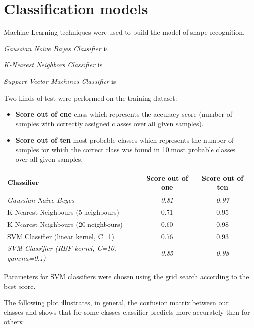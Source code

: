 \documentclass[12pt]{article}
\begin{document}
 
\section{Classification models}

Machine Learning techniques were used to build the model of shape recognition.  

\textit{Gaussian Naive Bayes Classifier} is

\textit{K-Nearest Neighbors Classifier} is

\textit{Support Vector Machines Classifier} is

Two kinds of test were performed on the training dataset:
\begin{itemize}
	\item \textbf{Score out of one} class which represents the accuracy score (number of samples with correctly assigned classes over all given samples).
	\item \textbf{Score out of ten} most probable classes which represents the number of samples for which the correct class was found in 10 most probable classes over all given samples.
\end{itemize}

\begin{center}
  \begin{tabular}{| l | c | c |}
    \hline
    \textbf{Classifier} & \textbf{Score out of one} & \textbf{Score out of ten}\\ \hline \hline
    \textit{Gaussian Naive Bayes} & \textit{0.81} & \textit{0.97} \\ \hline
	K-Nearest Neighbours (5 neighbours) & 0.71 & 0.95\\ \hline
	K-Nearest Neighbours (20 neighbours) & 0.60 & 0.98 \\ \hline
	SVM Classifier (linear kernel, C=1) & 0.76 & 0.93 \\ \hline
	\textit{SVM Classifier (RBF kernel, C=10, gamma=0.1)} & \textit{0.85} & \textit{0.98} \\ 
	\hline
  \end{tabular}
\end{center}

Parameters for SVM classifiers were chosen using the grid search according to the best score.

The following plot illustrates, in general, the confusion matrix between our classes and shows that for some classes classifier predicts more accurately then for others:
\end{document}
